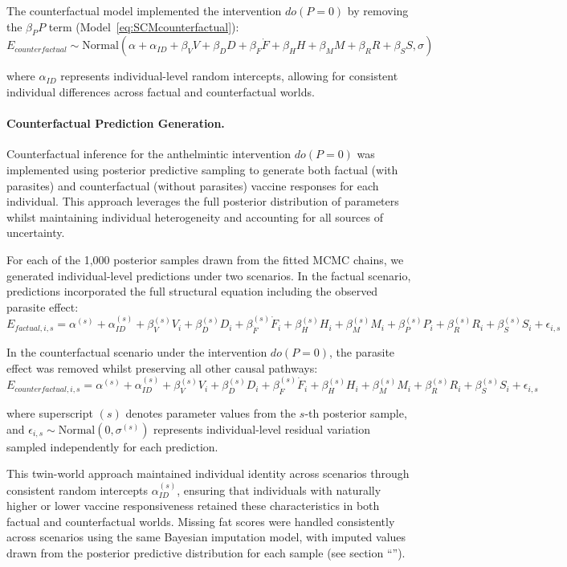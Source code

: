\documentclass[a4paper, hidelinks, 11pt]{article}
\begin{document}
\begin{appendices}
	The counterfactual model implemented the intervention $do(P=0)$ by removing the $\beta_P P$ term (Model~\ref{eq:SCMcounterfactual}):
	$$E_{counterfactual} \sim \text{Normal}(\alpha + \alpha_{ID} + \beta_V V + \beta_D D + \beta_{\dot{F}} \dot{F} + \beta_H H + \beta_M M + \beta_R R + \beta_S S, \sigma)$$

	where $\alpha_{ID}$ represents individual-level random intercepts, allowing for consistent individual differences across factual and counterfactual worlds.

	\paragraph{Counterfactual Prediction Generation.} \label{supdata:CounterfactualPredictionGeneration} Counterfactual inference for the anthelmintic intervention $do(P=0)$ was implemented using posterior predictive sampling to generate both factual (with parasites) and counterfactual (without parasites) vaccine responses for each individual. This approach leverages the full posterior distribution of parameters whilst maintaining individual heterogeneity and accounting for all sources of uncertainty.

	For each of the 1,000 posterior samples drawn from the fitted MCMC chains, we generated individual-level predictions under two scenarios. In the factual scenario, predictions incorporated the full structural equation including the observed parasite effect:
	$$E_{factual,i,s} = \alpha^{(s)} + \alpha_{ID}^{(s)} + \beta_V^{(s)} V_i + \beta_D^{(s)} D_i + \beta_{\dot{F}}^{(s)} \dot{F}_i + \beta_H^{(s)} H_i + \beta_M^{(s)} M_i + \beta_P^{(s)} P_i + \beta_R^{(s)} R_i + \beta_S^{(s)} S_i + \epsilon_{i,s}$$

	In the counterfactual scenario under the intervention $do(P=0)$, the parasite effect was removed whilst preserving all other causal pathways:
	$$E_{counterfactual,i,s} = \alpha^{(s)} + \alpha_{ID}^{(s)} + \beta_V^{(s)} V_i + \beta_D^{(s)} D_i + \beta_{\dot{F}}^{(s)} \dot{F}_i + \beta_H^{(s)} H_i + \beta_M^{(s)} M_i + \beta_R^{(s)} R_i + \beta_S^{(s)} S_i + \epsilon_{i,s}$$

	where superscript $(s)$ denotes parameter values from the $s$-th posterior sample, and $\epsilon_{i,s} \sim \text{Normal}(0, \sigma^{(s)})$ represents individual-level residual variation sampled independently for each prediction.

	This twin-world approach maintained individual identity across scenarios through consistent random intercepts $\alpha_{ID}^{(s)}$, ensuring that individuals with naturally higher or lower vaccine responsiveness retained these characteristics in both factual and counterfactual worlds. Missing fat scores were handled consistently across scenarios using the same Bayesian imputation model, with imputed values drawn from the posterior predictive distribution for each sample (see section ``'').


\end{appendices}
\end{document}

